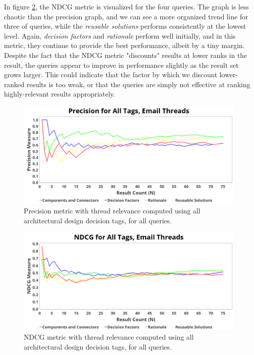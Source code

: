 \documentclass[a4paper, 12pt]{article}
\begin{document}
		In figure \ref{fig:ndcgall}, the NDCG metric is visualized for the four queries. The graph is less chaotic than the precision graph, and we can see a more organized trend line for three of queries, while the \textit{reusable solutions} performs consistently at the lowest level. Again, \textit{decision factors} and \textit{rationale} perform well initially, and in this metric, they continue to provide the best performance, albeit by a tiny margin. Despite the fact that the NDCG metric "discounts" results at lower ranks in the result, the queries appear to improve in performance slightly as the result set grows larger. This could indicate that the factor by which we discount lower-ranked results is too weak, or that the queries are simply not effective at ranking highly-relevant results appropriately.
		
		\begin{figure}
			\centering
			\includegraphics[width=\textwidth]{report/all_tags_thread_precision.png}
			\caption{Precision metric with thread relevance computed using all architectural design decision tags, for all queries.}
			\label{fig:precisionall}
		\end{figure}
		
		\begin{figure}
			\centering
			\includegraphics[width=\textwidth]{report/all_tags_thread_ndcg.png}
			\caption{NDCG metric with thread relevance computed using all architectural design decision tags, for all queries.}
			\label{fig:ndcgall}
		\end{figure}
	
\end{document}
